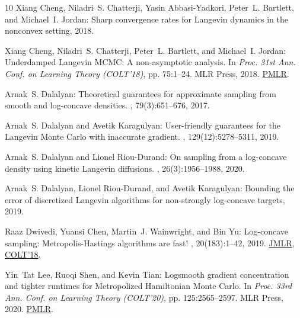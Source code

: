 \begin{thebibliography}{10}
{\sc Xiang Cheng, Niladri~S. Chatterji, Yasin Abbasi-Yadkori, Peter~L.
  Bartlett, and Michael~I. Jordan}: Sharp convergence rates for {L}angevin
  dynamics in the nonconvex setting, 2018.

{\sc Xiang Cheng, Niladri~S. Chatterji, Peter~L. Bartlett, and Michael~I.
  Jordan}: Underdamped {L}angevin {MCMC}: {A} non-asymptotic analysis.
\newblock In {\em Proc. 31st Ann. Conf. on Learning Theory (COLT'18)}, pp.
  75:1--24. MLR Press, 2018.
\newblock \href{https://proceedings.mlr.press/v75/cheng18a.html}{PMLR}.

{\sc Arnak~S. Dalalyan}: Theoretical guarantees for approximate sampling from
  smooth and log-concave densities.
, 79(3):651--676, 2017.

{\sc Arnak~S. Dalalyan and Avetik Karagulyan}: User-friendly guarantees for the
  {L}angevin {M}onte {C}arlo with inaccurate gradient.
, 129(12):5278--5311, 2019.

{\sc Arnak~S. Dalalyan and Lionel Riou-Durand}: On sampling from a log-concave
  density using kinetic {L}angevin diffusions.
, 26(3):1956--1988, 2020.

{\sc Arnak~S. Dalalyan, Lionel Riou-Durand, and Avetik Karagulyan}: Bounding
  the error of discretized {L}angevin algorithms for non-strongly log-concave
  targets, 2019.

{\sc Raaz Dwivedi, Yuansi Chen, Martin~J. Wainwright, and Bin Yu}: Log-concave
  sampling: {M}etropolis-{H}astings algorithms are fast!
, 20(183):1--42, 2019.
\newblock \href{https://jmlr.org/papers/v20/19-306.html}{JMLR}, \prelim
  \href{https://proceedings.mlr.press/v75/dwivedi18a.html}{COLT'18}.

{\sc Yin~Tat Lee, Ruoqi Shen, and Kevin Tian}: Logsmooth gradient concentration
  and tighter runtimes for {M}etropolized {H}amiltonian {M}onte {C}arlo.
\newblock In {\em Proc. 33rd Ann. Conf. on Learning Theory (COLT'20)}, pp.
  125:2565--2597. MLR Press, 2020.
\newblock \href{http://proceedings.mlr.press/v125/lee20b.html}{PMLR}.


\end{thebibliography}
